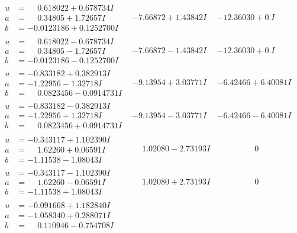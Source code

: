\documentclass[1p]{elsarticle_modified}
\theoremstyle{definition}
\begin{document}
$$\begin{array}{c|c|c}
 \hline 
\begin{aligned}
u &= \phantom{-}0.618022 + 0.678734 I \\
a &= \phantom{-}0.34805 + 1.72657 I \\
b &= -0.0123186 + 0.1252700 I\end{aligned}
 & -7.66872 + 1.43842 I & -12.36030 + 0. I\phantom{ +0.000000I} \\ \hline\begin{aligned}
u &= \phantom{-}0.618022 - 0.678734 I \\
a &= \phantom{-}0.34805 - 1.72657 I \\
b &= -0.0123186 - 0.1252700 I\end{aligned}
 & -7.66872 - 1.43842 I & -12.36030 + 0. I\phantom{ +0.000000I} \\ \hline\begin{aligned}
u &= -0.833182 + 0.382913 I \\
a &= -1.22956 - 1.32718 I \\
b &= \phantom{-}0.0823456 - 0.0914731 I\end{aligned}
 & -9.13954 + 3.03771 I & -6.42466 + 6.40081 I \\ \hline\begin{aligned}
u &= -0.833182 - 0.382913 I \\
a &= -1.22956 + 1.32718 I \\
b &= \phantom{-}0.0823456 + 0.0914731 I\end{aligned}
 & -9.13954 - 3.03771 I & -6.42466 - 6.40081 I \\ \hline\begin{aligned}
u &= -0.343117 + 1.102390 I \\
a &= \phantom{-}1.62260 + 0.06591 I \\
b &= -1.11538 - 1.08043 I\end{aligned}
 & \phantom{-}1.02080 - 2.73193 I & \phantom{-0.000000 } 0 \\ \hline\begin{aligned}
u &= -0.343117 - 1.102390 I \\
a &= \phantom{-}1.62260 - 0.06591 I \\
b &= -1.11538 + 1.08043 I\end{aligned}
 & \phantom{-}1.02080 + 2.73193 I & \phantom{-0.000000 } 0 \\ \hline\begin{aligned}
u &= -0.091668 + 1.182840 I \\
a &= -1.058340 + 0.288071 I \\
b &= \phantom{-}0.110946 - 0.754708 I\end{aligned}

\end{array}$$
\end{document}
